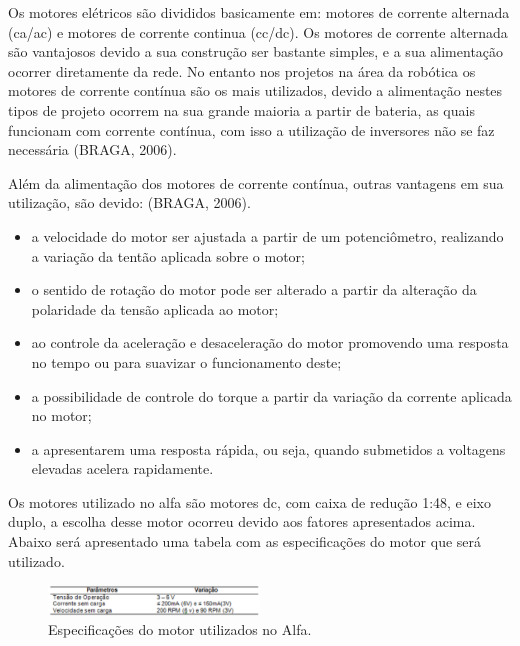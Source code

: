 Os motores elétricos são divididos basicamente em: motores de corrente alternada (ca/ac) e motores de corrente continua (cc/dc). Os motores de corrente alternada são vantajosos devido a sua construção ser bastante simples, e a sua alimentação ocorrer diretamente da rede. No entanto nos projetos na área da robótica os motores de corrente contínua são os mais utilizados, devido a alimentação nestes tipos de projeto ocorrem na sua grande maioria a partir de bateria, as quais funcionam com corrente contínua, com isso a utilização de inversores não se faz necessária (BRAGA, 2006).


Além da alimentação dos motores de corrente contínua, outras vantagens em sua utilização, são devido: (BRAGA, 2006).
\begin{itemize}
	\item a velocidade do motor ser ajustada a partir de um potenciômetro, realizando a variação da tentão aplicada sobre o motor;
	\item o sentido de rotação do motor pode ser alterado a partir da alteração da polaridade da tensão aplicada ao motor;
	\item ao controle da aceleração e desaceleração do motor promovendo uma resposta no tempo ou para suavizar o funcionamento deste;
	\item a possibilidade de controle do torque a partir da variação da corrente aplicada no motor;
	\item a apresentarem uma resposta rápida, ou seja, quando submetidos a voltagens elevadas acelera rapidamente.
\end{itemize}

Os motores utilizado no alfa são motores dc, com caixa de redução 1:48, e eixo duplo, a escolha desse motor ocorreu devido aos fatores apresentados acima. Abaixo será apresentado uma tabela com as especificações do motor que será utilizado.

\begin{figure}[H]
    \centering
    \includegraphics[width=0.5\textwidth]{figuras/tensao.eps}
    \caption{Especificações do motor utilizados no Alfa.}
    \label{fig:tensao}
\end{figure}

